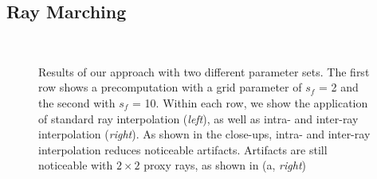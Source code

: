 \documentclass[journal]{vgtc}                %
\begin{document}
\subsection{Ray Marching}
\begin{figure}[t]
    \centering
    \\
    \caption{Results of our approach with two different parameter sets. The first row shows a precomputation with a grid parameter of $s_f$ = 2 and the second with $s_f$ = 10. Within each row, we show the application of standard ray interpolation ({\it left}), as well as intra- and inter-ray interpolation ({\it right}). As shown in the close-ups, intra- and inter-ray interpolation reduces noticeable artifacts. Artifacts are still noticeable with $2 \times 2$ proxy rays, as shown in ({a, \it right})}
    \label{fig:rayinterpolation}
\end{figure}
\end{document}
